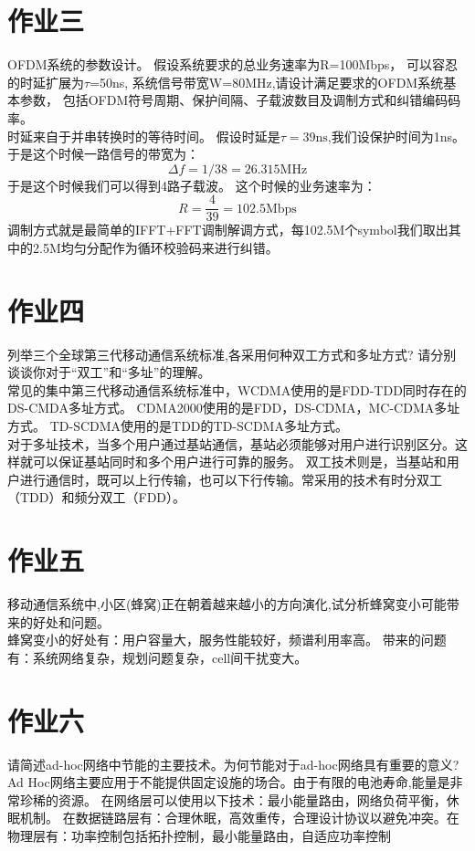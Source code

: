 \documentclass{article}
\begin{document}
\section{作业三}
OFDM系统的参数设计。
假设系统要求的总业务速率为R=100Mbps，
可以容忍的时延扩展为\(\tau\)=50ns,
系统信号带宽W=80MHz,请设计满足要求的OFDM系统基本参数，
包括OFDM符号周期、保护间隔、子载波数目及调制方式和纠错编码码率。\\
时延来自于并串转换时的等待时间。
假设时延是\(\tau = 39\mbox{ns}\),我们设保护时间为1ns。
于是这个时候一路信号的带宽为：
\begin{equation}
\Delta f = 1 / 38 = 26.315 \mbox{MHz}
\end{equation}
于是这个时候我们可以得到4路子载波。
这个时候的业务速率为：
\begin{equation}
R = \frac{4}{39} = 102.5\mbox{Mbps}
\end{equation}
调制方式就是最简单的IFFT+FFT调制解调方式，每102.5M个symbol我们取出其中的2.5M均匀分配作为循环校验码来进行纠错。
\section{作业四}
列举三个全球第三代移动通信系统标准,各采用何种双工方式和多址方式?
请分别谈谈你对于“双工”和“多址”的理解。\\
常见的集中第三代移动通信系统标准中，WCDMA使用的是FDD-TDD同时存在的DS-CMDA多址方式。
CDMA2000使用的是FDD，DS-CDMA，MC-CDMA多址方式。
TD-SCDMA使用的是TDD的TD-SCDMA多址方式。\\
对于多址技术，当多个用户通过基站通信，基站必须能够对用户进行识别区分。这样就可以保证基站同时和多个用户进行可靠的服务。
双工技术则是，当基站和用户进行通信时，既可以上行传输，也可以下行传输。常采用的技术有时分双工（TDD）和频分双工（FDD）。
\section{作业五}
移动通信系统中,小区(蜂窝)正在朝着越来越小的方向演化,试分析蜂窝变小可能带来的好处和问题。\\
蜂窝变小的好处有：用户容量大，服务性能较好，频谱利用率高。
带来的问题有：系统网络复杂，规划问题复杂，cell间干扰变大。
\section{作业六}
请简述ad-hoc网络中节能的主要技术。为何节能对于ad-hoc网络具有重要的意义?
Ad Hoc网络主要应用于不能提供固定设施的场合。由于有限的电池寿命,能量是非常珍稀的资源。
在网络层可以使用以下技术：最小能量路由，网络负荷平衡，休眠机制。
在数据链路层有：合理休眠，高效重传，合理设计协议以避免冲突。在物理层有：功率控制包括拓扑控制，最小能量路由，自适应功率控制
\end{document}
